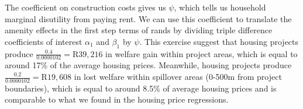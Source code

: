 \documentclass[12pt]{article}
\begin{document}
The coefficient on construction costs gives us $\psi$, which tells us household marginal disutility from paying rent.  We can use this coefficient to translate the amenity effects in the first step terms of rands by dividing triple difference coefficients of interest $\alpha_1$ and $\beta_1$ by $\psi$.  This exercise suggest that housing projects produce $\frac{0.4}{0.0000102} = \text{R}39,216$ in welfare gain within project areas, which is equal to around 17\% of the average housing prices.  Meanwhile, housing projects produce $\frac{0.2}{0.0000102} = \text{R}19,608$ in lost welfare within spillover areas (0-500m from project boundaries), which is equal to around 8.5\% of average housing prices and is comparable to what we found in the housing price regressions.
















\end{document}
